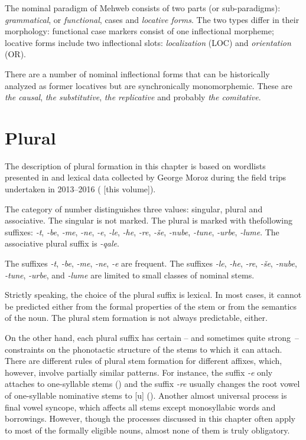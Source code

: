 ﻿\documentclass[output=paper]{langsci/langscibook}
\begin{document}
The nominal paradigm of Mehweb consists of two parts (or sub-paradigms):
\emph{grammatical}, or \emph{functional}, cases and \emph{locative
forms}. The two types differ in their morphology: functional case
markers consist of one inflectional morpheme; locative forms include two
inflectional slots: \emph{localization} (LOC) and \emph{orientation}
(OR).

There are a number of nominal inflectional forms that can be
historically analyzed as former locatives but are synchronically
monomorphemic. These are \emph{the causal}, \emph{the substitutive},
\emph{the replicative} and probably \emph{the comitative}.

\section{Plural}


The description of plural formation in this chapter is based on
wordlists presented in \citet{magometov1982} and lexical data collected by
George Moroz during the field trips undertaken in 2013–2016 (\citealt{moroz2019} [this volume]).


The category of number distinguishes three values: singular, plural and
associative. The singular is not marked. The plural is marked with the\pagebreak[4]
following suffixes: \emph{-t}, \emph{-be}, \emph{-me}, \emph{-ne},
\emph{-e}, \emph{-le}, \emph{-he}, \emph{-re}, \emph{-še}, \emph{-nube},
\emph{-tune}, \emph{-urbe}, \emph{-lume}. The associative plural suffix
is \emph{-qale}.

The suffixes \emph{-t}, \emph{-be}, \emph{-me}, \emph{-ne}, \emph{-e}
are frequent. The suffixes \emph{-le}, \emph{-he}, \emph{-re},
\emph{-še}, \emph{-nube}, \emph{-tune}, \emph{-urbe}, and \emph{-lume} are
limited to small classes of nominal stems.


Strictly speaking, the choice of the plural suffix is lexical. In most
cases, it cannot be predicted either from  the formal properties of the
stem or from the semantics of the noun. The plural stem formation is not
always predictable, either.

On the other hand, each plural suffix has certain – and sometimes quite
strong~– constraints on the phonotactic structure of the stems to which
it can attach. There are different rules of plural stem formation for
different affixes, which, however, involve partially similar patterns.
For instance, the suffix \emph{-e} only attaches to one-syllable stems
() and the suffix \emph{-re} usually changes the root vowel of
one-syllable nominative stems to [u] (). Another almost universal
process is final vowel syncope, which affects all stems except
monosyllabic words and borrowings. However, though the processes
discussed in this chapter often apply to most of the formally eligible
nouns, almost none of them is truly obligatory.
\end{document}
